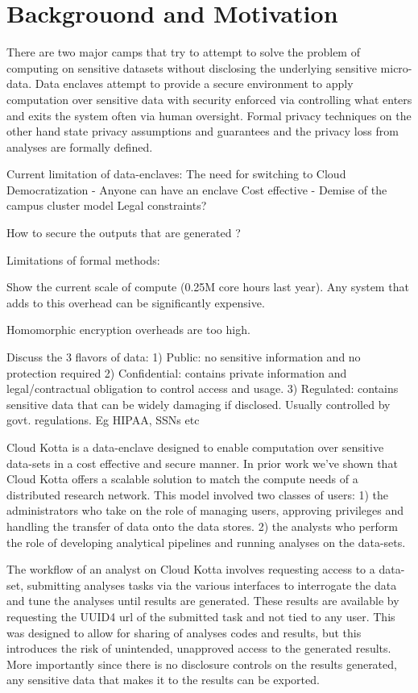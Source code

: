 \section{Backgrouond and Motivation} \label{sec:background}

There are two major camps that try to attempt to solve the problem of computing on sensitive
datasets without disclosing the underlying sensitive micro-data. Data enclaves attempt to
provide a secure environment to apply computation over sensitive data with security enforced
via controlling what enters and exits the system often via human oversight. Formal privacy
techniques on the other hand state privacy assumptions and guarantees and the privacy loss
from analyses are formally defined.


Current limitation of data-enclaves:
The need for switching to Cloud
      Democratization - Anyone can have an enclave
      Cost effective - Demise of the campus cluster model
      Legal constraints?

 How to secure the outputs that are generated ?

 Limitations of formal methods:

 Show the current scale of compute (0.25M core hours last year). Any system that adds to this overhead can
 be significantly expensive.

 Homomorphic encryption overheads are too high.


 Discuss the 3 flavors of data:
 1) Public: no sensitive information and no protection required
 2) Confidential: contains private information and legal/contractual obligation to control access and usage.
 3) Regulated: contains sensitive data that can be widely damaging if disclosed. Usually controlled by govt.
    regulations. Eg HIPAA, SSNs etc


Cloud Kotta is a data-enclave designed to enable computation over sensitive data-sets
in a cost effective and secure manner. In prior work we've shown that Cloud Kotta offers
a scalable solution to match the compute needs of a distributed research network.
This model involved two classes of users: 1) the administrators who take on the role of managing
users, approving privileges and handling the transfer of data onto the data stores. 2) the analysts
who perform the role of developing analytical pipelines and running analyses on the data-sets.

The workflow of an analyst on Cloud Kotta involves requesting access to a data-set, submitting analyses
tasks via the various interfaces to interrogate the data and tune the analyses until results are generated.
These results are available by requesting the UUID4 url of the submitted task and not tied to any user.
This was designed to allow for sharing of analyses codes and results, but this introduces the risk
of unintended, unapproved access to the generated results. More importantly since there is no disclosure
controls on the results generated, any sensitive data that makes it to the results can be exported.

